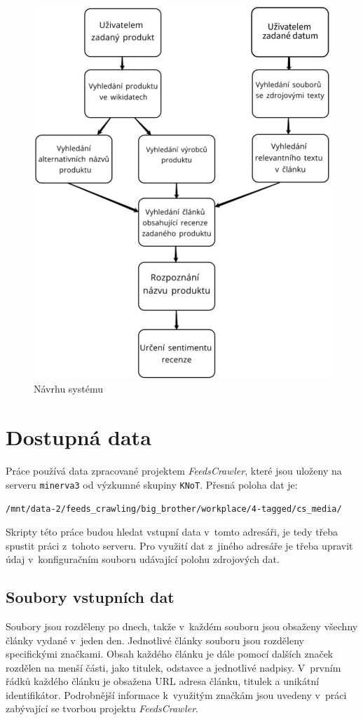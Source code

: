 \begin{figure}[h]
    \centering
    \includegraphics[scale=0.5]{obrazky-figures/navrh_systemu.pdf}
    \caption{Návrhu systému}
    \label{fig:navrh_systemu}
\end{figure}


\section{Dostupná data}
Práce používá data zpracované projektem \textit{FeedsCrawler}, které jsou uloženy na serveru \verb|minerva3| od výzkumné skupiny \verb|KNoT|. Přesná poloha dat je:
\begin{center}
\verb|/mnt/data-2/feeds_crawling/big_brother/workplace/4-tagged/cs_media/|
\end{center}
Skripty této práce budou hledat vstupní data v~tomto adresáři, je tedy třeba spustit práci z~tohoto serveru. Pro využití dat z~jiného adresáře je třeba upravit údaj v~konfiguračním souboru udávající polohu zdrojových dat.

\subsection*{Soubory vstupních dat}
Soubory jsou rozděleny po dnech, takže v~každém souboru jsou obsaženy všechny články vydané v~jeden den. Jednotlivé články souboru jsou rozděleny specifickými značkami. Obsah každého článku je dále pomocí dalších značek rozdělen na menší části, jako titulek, odstavce a jednotlivé nadpisy. V~prvním řádků každého článku je obsažena URL adresa článku, titulek a unikátní identifikátor. Podrobnější informace k~využitým značkám jsou uvedeny v~práci zabývající se tvorbou projektu \textit{FeedsCrawler}\cite{FITBT20846}.

